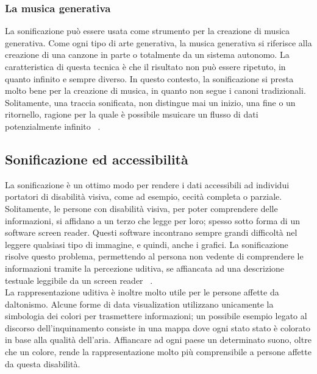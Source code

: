 \subsubsection{La musica generativa}
La sonificazione può essere usata come strumento per la creazione di musica generativa.
Come ogni tipo di arte generativa, la musica generativa si riferisce alla creazione di una canzone in parte o totalmente da un sistema autonomo.
La caratteristica di questa tecnica è che il risultato non può essere ripetuto, in quanto infinito e sempre diverso.
In questo contesto, la sonificazione si presta molto bene per la creazione di musica, in quanto non segue i canoni tradizionali.
Solitamente, una traccia sonificata, non distingue mai un inizio, una fine o un ritornello, ragione per la quale è possibile msuicare un flusso di dati potenzialmente infinito ~\cite{generative_music}.

\subsection{Sonificazione ed accessibilità}
La sonificazione è un ottimo modo per rendere i dati accessibili ad individui portatori di disabilità visiva, come ad esempio, cecità completa o parziale.
Solitamente, le persone con disabilità visiva, per poter comprendere delle informazioni, si affidano a un terzo che legge per loro; spesso sotto forma di un software screen reader.
Questi software incontrano sempre grandi difficoltà nel leggere qualsiasi tipo di immagine, e quindi, anche i grafici.
La sonificazione risolve questo problema, permettendo al persona non vedente di comprendere le informazioni tramite la percezione uditiva, se affiancata ad una descrizione testuale leggibile da un screen reader ~\cite{accessibility}.
\\
La rappresentazione uditiva è inoltre molto utile per le persone affette da daltonismo.
Alcune forme di data visualization utilizzano unicamente la simbologia dei colori per trasmettere informazioni; un possibile esempio legato al discorso dell'inquinamento consiste in una mappa dove ogni stato stato è colorato in base alla qualità dell'aria.
Affiancare ad ogni paese un determinato suono, oltre che un colore, rende la rappresentazione molto più comprensibile a persone affette da questa disabilità.

